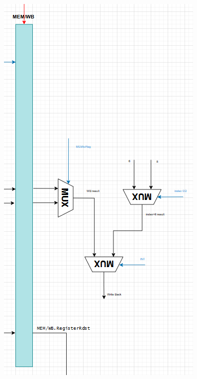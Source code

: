 \documentclass{report}
\begin{document}
\begin{minipage}{0.35\textwidth}
\begin{center}
    \includegraphics[width=\textwidth]{./assets/WB.png}
\end{center}
\end{minipage}
\end{document}
